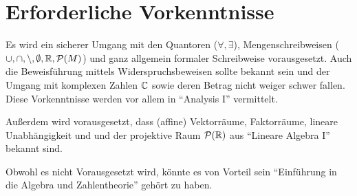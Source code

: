 \section*{Erforderliche Vorkenntnisse}
Es wird ein sicherer Umgang mit den Quantoren ($\forall, \exists$),
Mengenschreibweisen ($\cup, \cap, \setminus, \emptyset, \mathbb{R}, \mathcal{P}(M)$)
und ganz allgemein formaler Schreibweise vorausgesetzt. Auch die
Beweisführung mittels Widerspruchsbeweisen sollte bekannt sein und
der Umgang mit komplexen Zahlen $\mathbb{C}$ sowie deren Betrag nicht
weiger schwer fallen.
Diese Vorkenntnisse werden vor allem in \enquote{Analysis I} vermittelt.

Außerdem wird vorausgesetzt, dass (affine) Vektorräume, Faktorräume, 
lineare Unabhängigkeit und und der projektive Raum $\mathcal{P}(\mathbb{R})$ aus
\enquote{Lineare Algebra I} bekannt sind.

Obwohl es nicht Vorausgesetzt wird, könnte es von Vorteil sein
\enquote{Einführung in die Algebra und Zahlentheorie} gehört zu 
haben.
